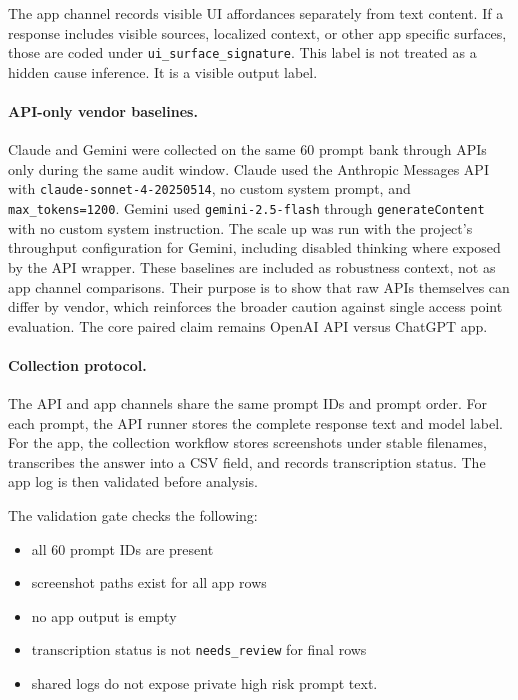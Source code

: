 The app channel records visible UI affordances separately from text content. If a
response includes visible sources, localized context, or other app specific
surfaces, those are coded under \texttt{ui\_surface\_signature}. This label is
not treated as a hidden cause inference. It is a visible output label.

\paragraph{API-only vendor baselines.}

Claude and Gemini were collected on the same 60 prompt bank through APIs only
during the same audit window. Claude used the Anthropic Messages API with
\texttt{claude-sonnet-4-20250514}, no custom system prompt, and
\texttt{max\_tokens=1200}. Gemini used \texttt{gemini-2.5-flash} through
\texttt{generateContent} with no custom system instruction. The scale up was run
with the project's throughput configuration for Gemini, including disabled
thinking where exposed by the API wrapper. These baselines are included as
robustness context, not as app channel comparisons. Their purpose is to show that
raw APIs themselves can differ by vendor, which reinforces the broader caution
against single access point evaluation. The core paired claim remains OpenAI API
versus ChatGPT app.

\paragraph{Collection protocol.}

The API and app channels share the same prompt IDs and prompt order. For each
prompt, the API runner stores the complete response text and model label. For
the app, the collection workflow stores screenshots under stable filenames,
transcribes the answer into a CSV field, and records transcription status. The
app log is then validated before analysis.

The validation gate checks the following:

\begin{itemize}
  \item all 60 prompt IDs are present
  \item screenshot paths exist for all app rows
  \item no app output is empty
  \item transcription status is not \texttt{needs\_review} for final rows
  \item shared logs do not expose private high risk prompt text.
\end{itemize}

